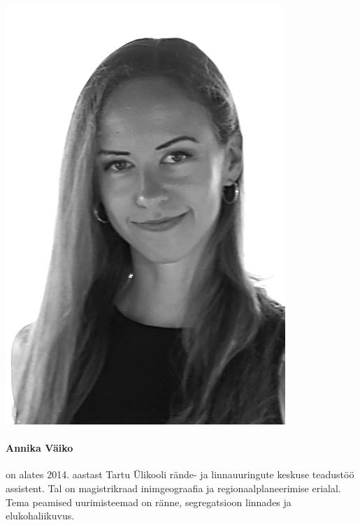 \documentclass[estonian,]{article}
\let\oldparagraph\paragraph
\renewcommand{\paragraph}[1]{\oldparagraph{#1}\mbox{}}
\begin{document}
\begin{flushleft}\includegraphics[width=0.5\linewidth]{figures/6-authors/AnnikaVaiko} \end{flushleft}

\hypertarget{annika-vuxe4iko}{%
\paragraph{Annika Väiko}\label{annika-vuxe4iko}}

on alates 2014. aastast Tartu Ülikooli rände- ja linnauuringute keskuse teadustöö assistent. Tal on magistrikraad inimgeograafia ja regionaalplaneerimise erialal. Tema peamised uurimisteemad on ränne, segregatsioon linnades ja elukohaliikuvus.
\end{document}
